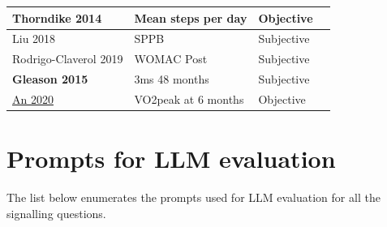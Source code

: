 \documentclass[sn-mathphys,Numbered]{sn-jnl}%
\begin{document}
\begin{longtable}{|p{3cm}|p{3.5cm}|p{3cm}|p{1.7cm}|}
\hline
\textbf{Thorndike 2014} & Mean steps per day & Objective & \cite{thorndike2014activity} \\
\hline
Liu 2018 & SPPB & Subjective & \cite{liu2018effect} \\
\hline
Rodrigo-Claverol 2019 & WOMAC Post & Subjective & \cite{rodrigo2019animal} \\
\hline
\textbf{Gleason 2015} & 3ms 48 months & Subjective & \cite{gleason2015effects} \\
\hline
\underline{An 2020} & VO2peak at 6 months & Objective & \cite{an2020patterns} \\
\hline
\end{longtable}
%
%
%
\section*{Prompts for LLM evaluation}
\label{sec:llms}
%
The list below enumerates the prompts used for LLM evaluation for all the signalling questions.
\end{document}
